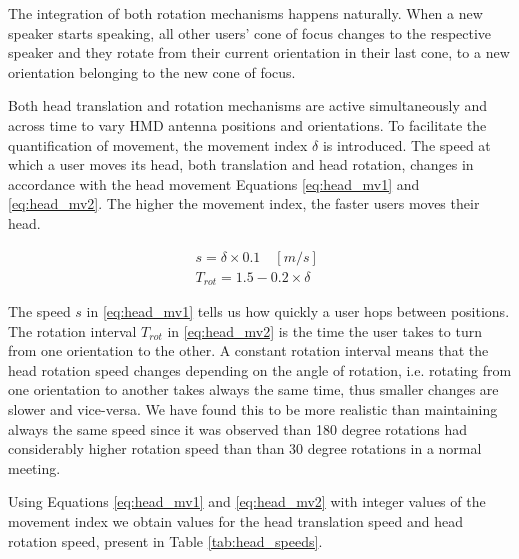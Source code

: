 
\vspace{.4cm}

The integration of both rotation mechanisms happens naturally. When a new speaker starts speaking, all other users' cone of focus changes to the respective speaker and they rotate from their current orientation in their last cone, to a new orientation belonging to the new cone of focus.

Both head translation and rotation mechanisms are active simultaneously and across time to vary \ac{HMD} antenna positions and orientations. To facilitate the quantification of movement, the movement index $\delta$ is introduced. The speed at which a user moves its head, both translation and head rotation, changes in accordance with the head movement Equations \eqref{eq:head_mv1} and \eqref{eq:head_mv2}. The higher the movement index, the faster users moves their head.

\begin{gather} 
    s = \delta \times 0.1 \quad [m/s] \label{eq:head_mv1} \\
    T_{rot} = 1.5 - 0.2 \times \delta  \quad  \label{eq:head_mv2}
\end{gather}

The speed $s$ in \ref{eq:head_mv1} tells us how quickly a user hops between positions. The rotation interval $T_{rot}$ in \ref{eq:head_mv2} is the time the user takes to turn from one orientation to the other. A constant rotation interval means that the head rotation speed changes depending on the angle of rotation, i.e. rotating from one orientation to another takes always the same time, thus smaller changes are slower and vice-versa. We have found this to be more realistic than maintaining always the same speed since it was observed than 180 degree rotations had considerably higher rotation speed than than 30 degree rotations in a normal meeting.

Using Equations \eqref{eq:head_mv1} and \eqref{eq:head_mv2} with integer values of the movement index we obtain values for the head translation speed and head rotation speed, present in Table \ref{tab:head_speeds}.

